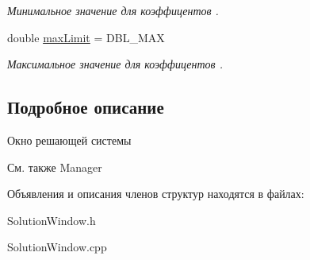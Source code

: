 \begin{DoxyCompactItemize}
\begin{DoxyCompactList}\small\item\em Минимальное значение для коэффицентов . \item\end{DoxyCompactList}\item 
\hypertarget{group___u_i_ga682969b1ad756864beaacb4fa1b8120d}{
double \hyperlink{group___u_i_ga682969b1ad756864beaacb4fa1b8120d}{maxLimit} = DBL\_\-MAX}
\label{group___u_i_ga682969b1ad756864beaacb4fa1b8120d}

\begin{DoxyCompactList}\small\item\em Максимальное значение для коэффицентов . \item\end{DoxyCompactList}\end{DoxyCompactItemize}


\subsection{Подробное описание}
Окно решающей системы \begin{DoxySeeAlso}{См. также}
Manager  
\end{DoxySeeAlso}


Объявления и описания членов структур находятся в файлах:\begin{DoxyCompactItemize}
\item 
SolutionWindow.h\item 
SolutionWindow.cpp\end{DoxyCompactItemize}
